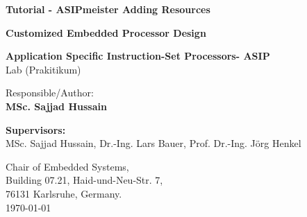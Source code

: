 \begin{titlepage}
\thispagestyle{empty}

\begin{center}
\hbox{}
\vfill

{\usesf\large
{\huge\bfseries Tutorial - ASIPmeister Adding Resources}
\vskip 2.5cm

{\LARGE\bfseries Customized Embedded Processor Design}
\vskip 0.25cm

{\large\bfseries Application Specific Instruction-Set Processors- ASIP\\}
Lab (Prakitikum)
\vskip 1.5cm

Responsible/Author:  \\
{\large\bfseries MSc. Sajjad Hussain\\}

}
\end{center}
\vskip 3cm

\textbf{Supervisors:}  \\
{MSc. Sajjad Hussain,  Dr.-Ing. Lars Bauer, Prof. Dr.-Ing. Jörg Henkel\\}

\vskip 2cm
Chair of Embedded Systems,\\
Building 07.21, Haid-und-Neu-Str. 7, \\
76131 Karlsruhe, Germany. \\

\vskip 1cm
\rightline\today

\vfill
\end{titlepage}
